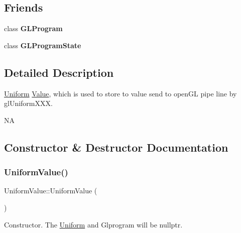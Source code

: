 \subsection*{Friends}
\begin{DoxyCompactItemize}
\item 
\mbox{\label{classUniformValue_a093a19c3860a594a811229dda18dca73}} 
class {\bfseries G\+L\+Program}
\item 
\mbox{\label{classUniformValue_ae18eab2cdc34c4231ddade1d262fab25}} 
class {\bfseries G\+L\+Program\+State}
\end{DoxyCompactItemize}


\subsection{Detailed Description}
\hyperlink{structUniform}{Uniform} \hyperlink{classValue}{Value}, which is used to store to value send to open\+GL pipe line by gl\+Uniform\+X\+XX.

NA 

\subsection{Constructor \& Destructor Documentation}
\mbox{\label{classUniformValue_a981f70651e0d28ab7bad561370bd5864}} 
\subsubsection{\texorpdfstring{Uniform\+Value()}{UniformValue()}\hspace{0.1cm}{\footnotesize\ttfamily [1/4]}}
{\footnotesize\ttfamily Uniform\+Value\+::\+Uniform\+Value (\begin{DoxyParamCaption}{ }\end{DoxyParamCaption})}

Constructor. The \hyperlink{structUniform}{Uniform} and Glprogram will be nullptr. \mbox{\label{classUniformValue_a3abad7ce21beca7b12cd8c242b2129d5}} 
